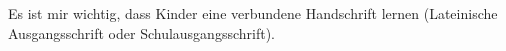 Es ist mir wichtig, dass Kinder eine verbundene Handschrift lernen (Lateinische Ausgangsschrift oder Schulausgangsschrift).